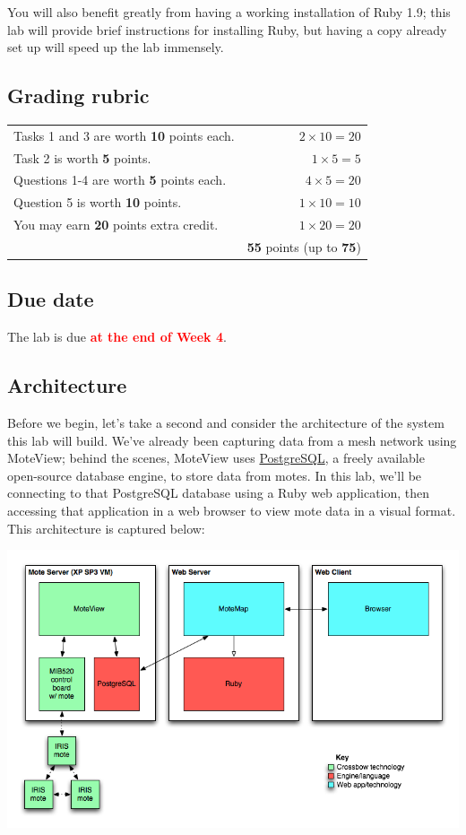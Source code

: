 \documentclass{article}
\newcommand{\labduedate}{at the end of Week 4}
\begin{document}
You will also benefit greatly from having a working installation of Ruby 1.9; this lab will provide brief instructions for installing Ruby, but having a copy already set up will speed up the lab immensely.

\subsection*{Grading rubric}
\begin{tabular}{p{5.5in} r}
Tasks 1 and 3 are worth \textbf{10} points each. & $2 \times 10 = 20$ \\
Task 2 is worth \textbf{5} points. & $1 \times 5 = 5$ \\
Questions 1-4 are worth \textbf{5} points each. & $4 \times 5 = 20$ \\
Question 5 is worth \textbf{10} points. & $1 \times 10 = 10$ \\
You may earn \textbf{20} points extra credit. & $1 \times 20 = 20$ \\ \hline
& \textbf{55} points (up to \textbf{75})
\end{tabular}

\subsection*{Due date}
The lab is due \textcolor{red}{\textbf{\labduedate}}.



\subsection*{Architecture}

Before we begin, let's take a second and consider the architecture of the system this lab will build. We've already been capturing data from a mesh network using MoteView; behind the scenes, MoteView uses \href{http://www.postgresql.org/}{PostgreSQL}, a freely available open-source database engine, to store data from motes. In this lab, we'll be connecting to that PostgreSQL database using a Ruby web application, then accessing that application in a web browser to view mote data in a visual format. This architecture is captured below:

\begin{center}
\includegraphics[width=6in]{arch.png}
\end{center}
\end{document}
